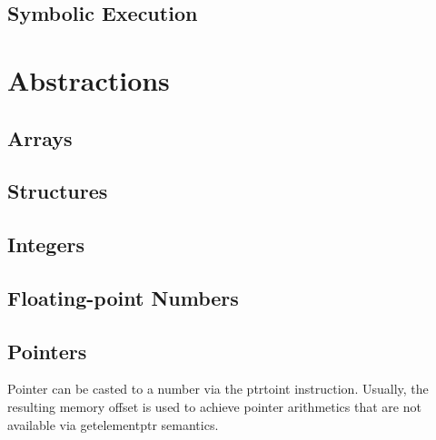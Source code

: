 \documentclass{article}
\begin{document}
\subsection{Symbolic Execution}

\section{Abstractions}
\subsection{Arrays}

\subsection{Structures}

\subsection{Integers}

\subsection{Floating-point Numbers}

\subsection{Pointers}

Pointer can be casted to a number via the ptrtoint instruction.
Usually, the resulting memory offset is used to achieve pointer
arithmetics that are not available via getelementptr semantics.



\cleardoublepage
\begin{thebibliography}{9}

\end{thebibliography}
\end{document}
